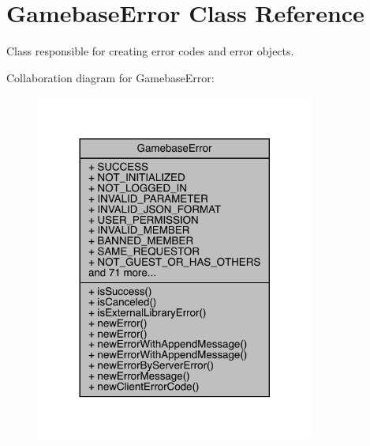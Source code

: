 \hypertarget{classcom_1_1toast_1_1android_1_1gamebase_1_1base_1_1_gamebase_error}{}\section{Gamebase\+Error Class Reference}
\label{classcom_1_1toast_1_1android_1_1gamebase_1_1base_1_1_gamebase_error}


Class responsible for creating error codes and error objects.  




Collaboration diagram for Gamebase\+Error\+:
\nopagebreak
\begin{figure}[H]
\begin{center}
\leavevmode
\includegraphics[width=260pt]{classcom_1_1toast_1_1android_1_1gamebase_1_1base_1_1_gamebase_error__coll__graph}
\end{center}
\end{figure}
